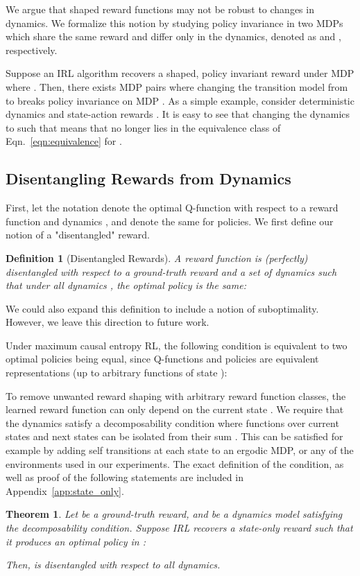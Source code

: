 \documentclass{article} \usepackage{iclr2018_conference,times}
\newtheorem{theorem}{Theorem}[section]
\newtheorem{definition}{Definition}[section]
\begin{document}
We argue that shaped reward functions may not be robust to changes in dynamics. We formalize this notion by studying policy invariance in two MDPs  which share the same reward and differ only in the dynamics, denoted as  and , respectively. 

Suppose an IRL algorithm recovers a shaped, policy invariant reward  under MDP  where . Then, there exists MDP pairs  where changing the transition model from  to  breaks policy invariance on MDP . As a simple example, consider deterministic dynamics  and state-action rewards . It is easy to see that changing the dynamics  to  such that  means that  no longer lies in the equivalence class of Eqn.~\ref{eqn:equivalence} for .

\subsection{Disentangling Rewards from Dynamics}
First, let the notation  denote the optimal Q-function with respect to a reward function  and dynamics , and  denote the same for policies. We first define our notion of a "disentangled" reward.

\begin{definition}[Disentangled Rewards]
A reward function  is (perfectly) disentangled with respect to a ground-truth reward  and a set of dynamics  such that under all dynamics , the optimal policy is the same:

\end{definition}
We could also expand this definition to include a notion of suboptimality. However, we leave this direction to future work.

Under maximum causal entropy RL, the following condition is equivalent to two optimal policies being equal, since Q-functions and policies are equivalent representations (up to arbitrary functions of state ):


To remove unwanted reward shaping with arbitrary reward function classes, the learned reward function can only depend on the current state . We require that the dynamics satisfy a decomposability condition where functions over current states  and next states  can be isolated from their sum . This can be satisfied for example by adding self transitions at each state to an ergodic MDP, or any of the environments used in our experiments. The exact definition of the condition, as well as proof of the following statements are included in Appendix~\ref{app:state_only}. 

\begin{theorem}
\label{thm:suff}
Let  be a ground-truth reward, and  be a dynamics model satisfying the decomposability condition. Suppose IRL recovers a state-only reward  such that it produces an optimal policy in :

Then,  is disentangled with respect to all dynamics.
\end{theorem}
\end{document}
